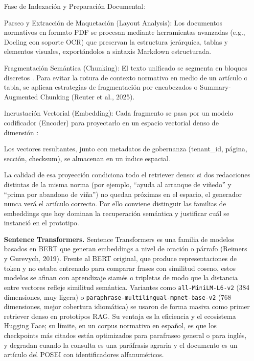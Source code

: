 Fase de Indexación y Preparación Documental:

Parseo y Extracción de Maquetación (Layout Analysis): Los documentos normativos en formato PDF se procesan mediante herramientas avanzadas (e.g., Docling con soporte OCR) que preservan la estructura jerárquica, tablas y elementos visuales, exportándolos a sintaxis Markdown estructurada.

Fragmentación Semántica (Chunking): El texto unificado se segmenta en bloques discretos . Para evitar la rotura de contexto normativo en medio de un artículo o tabla, se aplican estrategias de fragmentación por encabezados o Summary-Augmented Chunking (Reuter et al., 2025).

Incrustación Vectorial (Embedding): Cada fragmento  se pasa por un modelo codificador (Encoder) para proyectarlo en un espacio vectorial denso de dimensión :

Los vectores resultantes, junto con metadatos de gobernanza (tenant\_id, página, sección, checksum), se almacenan en un índice espacial.

La calidad de esa proyección condiciona todo el retriever denso: si dos redacciones distintas de la misma norma (por ejemplo, ``ayuda al arranque de viñedo'' y ``prima por abandono de viña'') no quedan próximas en el espacio, el generador nunca verá el artículo correcto. Por ello conviene distinguir las familias de embeddings que hoy dominan la recuperación semántica y justificar cuál se instanció en el prototipo.

\textbf{Sentence Transformers.} Sentence Transformers es una familia de modelos basados en BERT que generan embeddings a nivel de oración o párrafo (Reimers y Gurevych, 2019). Frente al BERT original, que produce representaciones de token y no estaba entrenado para comparar frases con similitud coseno, estos modelos se afinan con aprendizaje siamés o tripletas de modo que la distancia entre vectores refleje similitud semántica. Variantes como \texttt{all-MiniLM-L6-v2} (384 dimensiones, muy ligera) o \texttt{paraphrase-multilingual-mpnet-base-v2} (768 dimensiones, mejor cobertura idiomática) se usaron de forma masiva como primer retriever denso en prototipos RAG. Su ventaja es la eficiencia y el ecosistema Hugging Face; su límite, en un corpus normativo en español, es que los checkpoints más citados están optimizados para parafraseo general o para inglés, y degradan cuando la consulta es una paráfrasis agraria y el documento es un artículo del POSEI con identificadores alfanuméricos.

